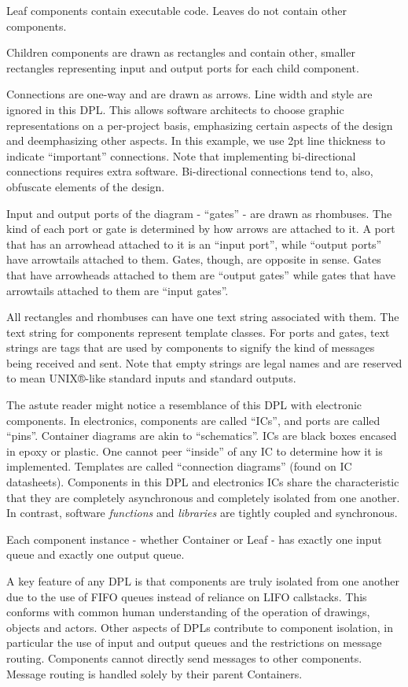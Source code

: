 \documentclass[10pt,anonymous,review]{acmart}
\begin{document}
Leaf components contain executable code. Leaves do not contain other components.

Children components are drawn as rectangles and contain other, smaller rectangles representing input and output ports for each child component.

Connections are one-way and are drawn as arrows. Line width and style are ignored in this DPL. This allows software architects to choose graphic representations on a per-project basis, emphasizing certain aspects of the design and deemphasizing other aspects. In this example, we use 2pt line thickness to indicate “important” connections. Note that implementing bi-directional connections requires extra software. Bi-directional connections tend to,
also, obfuscate elements of the design.

Input and output ports of the diagram - “gates” - are drawn as rhombuses. 
The kind of each port or gate is determined by how arrows are attached to it. A port that has an arrowhead attached to it is an “input port”, while “output ports” have arrowtails attached to them. Gates, though, are opposite in sense. Gates that have arrowheads attached to them are “output gates” while gates that have arrowtails attached to them are “input gates”.

All rectangles and rhombuses can have one text string associated with them. The text string for components represent template classes. For ports and gates, text strings are tags that are used by components to signify the kind of messages being received and sent. Note that empty strings are legal names and are reserved to mean UNIX®-like standard inputs and standard outputs.

The astute reader might notice a resemblance of this DPL with electronic components. In electronics, components are called “ICs”, and ports are called “pins”. Container diagrams are akin to “schematics”. ICs are black boxes encased in epoxy or plastic. One cannot peer “inside” of any IC to determine how it is implemented. Templates are called “connection diagrams” (found on IC datasheets). Components in this DPL and electronics ICs share the characteristic that they are completely asynchronous and completely isolated from one another. In contrast, software \emph{functions} and \emph{libraries} are tightly coupled and synchronous.

Each component instance - whether Container or Leaf - has exactly one input queue and exactly one output queue.

A key feature of any DPL is that components are truly isolated from one another due to the use of FIFO queues instead of reliance on LIFO callstacks. This conforms with common human understanding of the operation of drawings, objects and actors. Other aspects of DPLs contribute to component isolation, in particular the use of input and output queues and the restrictions on message routing. Components cannot directly send messages to other components. Message routing is handled solely by their parent Containers.
\end{document}
